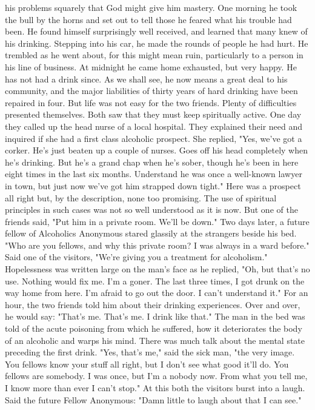 \begin{biblechapter}
his problems squarely that God might give him mastery.
One morning he took the bull by the horns and set out to tell those he feared what his trouble had been.  He found himself surprisingly well received, and learned that many knew of his drinking.  Stepping into his car, he made the rounds of people he had hurt.  He trembled as he went about, for this might mean ruin, particularly to a person in his line of business.
At midnight he came home exhausted, but very happy.  He has not had a drink since.  As we shall see, he now means a great deal to his community, and the major liabilities of thirty years of hard drinking have been repaired in four.
But life was not easy for the two friends.  Plenty of difficulties presented themselves.  Both saw that they must keep spiritually active.  One day they called up the head nurse of a local hospital.  They explained their need and inquired if she had a first class alcoholic prospect.
She replied, "Yes, we've got a corker.  He's just beaten up a couple of nurses.  Goes off his head completely when he's drinking.  But he's a grand chap when he's sober, though he's been in here eight times in the last six months.  Understand he was once a well-known lawyer in town, but just now we've got him strapped down tight." 
Here was a prospect all right but, by the description, none too promising.  The use of spiritual principles in such cases was not so well understood as it is now.  But one of the friends said, "Put him in a private room.  We'll be down."
Two days later, a future fellow of Alcoholics Anonymous stared glassily at the strangers beside his bed.  "Who are you fellows, and why this private room?  I was always in a ward before."
Said one of the visitors, "We're giving you a treatment for alcoholism."
Hopelessness was written large on the man's face as he replied, "Oh, but that's no use.  Nothing would fix me.  I'm a goner.  The last three times, I got drunk on the way home from here.  I'm afraid to go out the door.  I can't understand it."
For an hour, the two friends told him about their drinking experiences.  Over and over, he would say: "That's me.  That's me.  I drink like that."
The man in the bed was told of the acute poisoning from which he suffered, how it deteriorates the body of an alcoholic and warps his mind.  There was much talk about the mental state preceding the first drink.
"Yes, that's me," said the sick man, "the very image.  You fellows know your stuff all right, but I don't see what good it'll do.  You fellows are somebody.  I was once, but I'm a nobody now.  From what you tell me, I know more than ever I can't stop."  At this both the visitors burst into a laugh.  Said the future Fellow Anonymous: "Damn little to laugh about that I can see."

\end{biblechapter}
